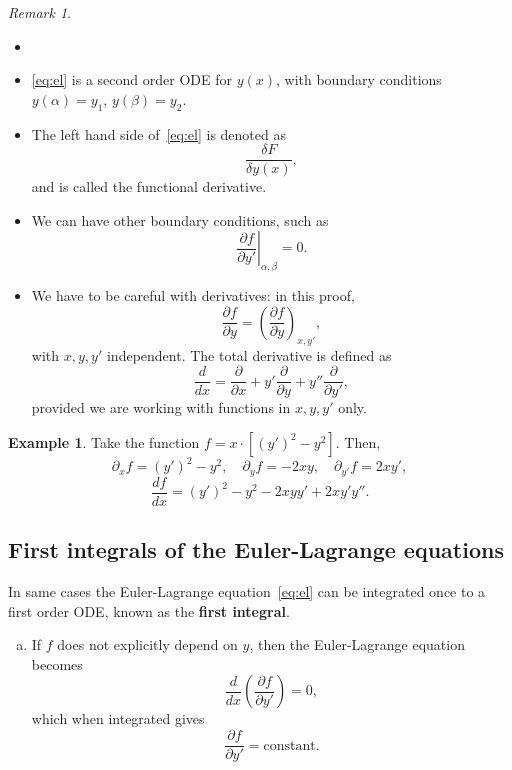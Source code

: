 \documentclass[12pt]{article}
\theoremstyle{definition}
\newtheorem{example}{Example}[section]
\theoremstyle{remark}
\newtheorem*{remark}{Remark}
\begin{document}
\begin{remark}
	\begin{itemize}
		\item[]
		\item \eqref{eq:el} is a second order ODE for $y(x)$, with boundary conditions $y(\alpha) = y_1$, $y(\beta) = y_2$.
		\item The left hand side of~\eqref{eq:el} is denoted as
			\[
				\frac{\delta F}{\delta y(x)}
			,\]
			and is called the functional derivative.
		\item We can have other boundary conditions, such as
			\[
			\left. \frac{\partial f}{\partial y'} \right|_{\alpha, \beta} = 0
			.\]
		\item We have to be careful with derivatives: in this proof,
			\[
				\frac{\partial f}{\partial y} = \left( \frac{\partial f}{\partial y} \right)_{x, y'}
			,\]
			with $x, y, y'$ independent. The total derivative is defined as
			\[
			\frac{d}{dx} = \frac{\partial}{\partial x} + y' \frac{\partial}{\partial y} + y'' \frac{\partial}{\partial y'}
			,\]
			provided we are working with functions in $x, y, y'$ only.
	\end{itemize}
	
\end{remark}

\begin{adjustbox}{minipage = \columnwidth - 25.5pt, margin=1em, frame=1pt, margin=0em}
\begin{example}
	Take the function $f = x \cdot [(y')^2 - y^2]$. Then,
	\[
		\partial_{x} f = (y')^2 - y^2, \quad \partial_{y} f = -2xy, \quad \partial_{y'} f = 2xy'
	,\]
	\[
		\frac{df}{dx} = (y')^2 - y^2 - 2xyy' + 2xy'y''
	.\]
\end{example}
\end{adjustbox}

\subsection{First integrals of the Euler-Lagrange equations}%
\label{sub:first_integrals_of_the_euler_lagrange_equations}

In same cases the Euler-Lagrange equation~\eqref{eq:el} can be integrated once to a first order ODE, known as the \textbf{first integral}.

\begin{enumerate}[(a)]
	\item If $f$ does not explicitly depend on $y$, then the Euler-Lagrange equation becomes
		\[
			\frac{d}{dx} \left( \frac{\partial f}{\partial y'} \right) = 0
		,\]
		which when integrated gives
		\[
			\frac{\partial f}{\partial y'} = \text{constant} \tag{2.1}\label{eq:el-a}
		.\] 
\end{enumerate}
\end{document}
